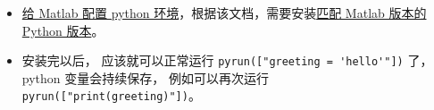 
\begin{itemize}
\item \href{https://www.mathworks.com/help/releases/R2024b/matlab/matlab_external/install-supported-python-implementation.html}{给 Matlab 配置 python 环境}，根据该文档，需要安装\href{https://www.mathworks.com/support/requirements/python-compatibility.html}{匹配 Matlab 版本的 Python 版本}。
\item 安装完以后， 应该就可以正常运行 \verb`pyrun(["greeting = 'hello'"])` 了， python 变量会持续保存， 例如可以再次运行 \verb`pyrun(["print(greeting)"])`。
\end{itemize}
